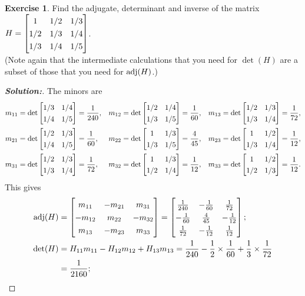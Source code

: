 \documentclass[a4paper]{amsart}
\theoremstyle{definition}
\newtheorem{exercise}{Exercise}
\newenvironment{solution}{\begin{proof}[\textbf{Solution:}] \vphantom{u}}{\end{proof}}
\begin{document}
\begin{exercise}\label{ex-adjugate-hilbert}
 Find the adjugate, determinant and inverse of the matrix
 $H=\bbm 1&1/2&1/3 \\ 1/2&1/3&1/4 \\ 1/3&1/4&1/5 \ebm$.  \\
 (Note again that the intermediate calculations that you need for
 $\det(H)$ are a subset of those that you need for $\operatorname{adj}(H)$.)
\end{exercise}
\begin{solution}
 The minors are 
 \begin{align*}
  m_{11} &= \det\bbm 1/3&1/4 \\ 1/4&1/5 \ebm = \frac{1}{240}, &
  m_{12} &= \det\bbm 1/2&1/4 \\ 1/3&1/5 \ebm = \frac{1}{60}, &
  m_{13} &= \det\bbm 1/2&1/3 \\ 1/3&1/4 \ebm = \frac{1}{72}, \\
  m_{21} &= \det\bbm 1/2&1/3 \\ 1/4&1/5 \ebm = \frac{1}{60}, &
  m_{22} &= \det\bbm 1  &1/3 \\ 1/3&1/5 \ebm = \frac{4}{45}, &
  m_{23} &= \det\bbm 1  &1/2 \\ 1/3&1/4 \ebm = \frac{1}{12}, \\
  m_{31} &= \det\bbm 1/2&1/3 \\ 1/3&1/4 \ebm = \frac{1}{72}, &
  m_{32} &= \det\bbm 1  &1/3 \\ 1/2&1/4 \ebm = \frac{1}{12}, &
  m_{33} &= \det\bbm 1  &1/2 \\ 1/2&1/3 \ebm = \frac{1}{12}.
 \end{align*}
 This gives
 \begin{align*} 
  \adj(H) &= \bbm  m_{11} & -m_{21} &  m_{31} \\
                  -m_{12} &  m_{22} & -m_{32} \\
                   m_{13} & -m_{23} &  m_{33} \ebm
           = \renewcommand{\arraystretch}{1.3} \bbm 
                   \frac{1}{240} & -\frac{1}{60} & \frac{1}{72} \\
                  -\frac{1}{60} &  \frac{4}{45} & -\frac{1}{12} \\
                   \frac{1}{72} & -\frac{1}{12} &  \frac{1}{12} \ebm ;
                   \\
  \det(H) &= H_{11}m_{11} - H_{12}m_{12} + H_{13}m_{13} 
           = \frac{1}{240} - \frac{1}{2}\tm\frac{1}{60} +
             \frac{1}{3}\tm\frac{1}{72} \\
          &= \frac{1}{2160} ; \\

\end{align*}
\end{solution}
\end{document}
